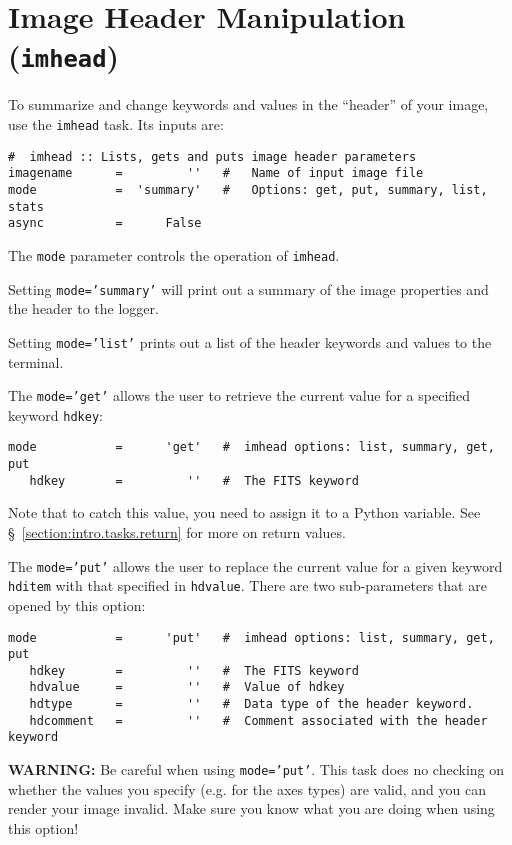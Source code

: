 \section{Image Header Manipulation ({\tt imhead})}
\label{section:analysis.imhead}

To summarize and change keywords and values in the ``header'' of
your image, use the {\tt imhead} task.  Its inputs are:
\small
\begin{verbatim}
#  imhead :: Lists, gets and puts image header parameters
imagename      =         ''   #   Name of input image file
mode           =  'summary'   #   Options: get, put, summary, list, stats
async          =      False      
\end{verbatim}
\normalsize

The {\tt mode} parameter controls the operation of {\tt imhead}.

Setting {\tt mode='summary'} will print out a summary of the image
properties and the header to the logger.

Setting {\tt mode='list'} prints out a list of the header keywords
and values to the terminal.

The {\tt mode='get'} allows the user to retrieve the current value 
for a specified keyword {\tt hdkey}:
\small
\begin{verbatim}
mode           =      'get'   #  imhead options: list, summary, get, put
   hdkey       =         ''   #  The FITS keyword
\end{verbatim}
\normalsize
Note that to catch this value, you need to assign it to a Python
variable.
See \S~\ref{section:intro.tasks.return} for more on return values.

The {\tt mode='put'} allows the user to replace the current value 
for a given keyword {\tt hditem} with that specified in {\tt hdvalue}.  
There are two sub-parameters that are opened by this option:
\small
\begin{verbatim}
mode           =      'put'   #  imhead options: list, summary, get, put
   hdkey       =         ''   #  The FITS keyword
   hdvalue     =         ''   #  Value of hdkey
   hdtype      =         ''   #  Data type of the header keyword.
   hdcomment   =         ''   #  Comment associated with the header keyword

\end{verbatim}
\normalsize
{\bf WARNING:} Be careful when using {\tt mode='put'}.  This task does
no checking on whether the values you specify (e.g. for the axes
types) are valid, and you can render your image invalid.  Make sure you
know what you are doing when using this option!

